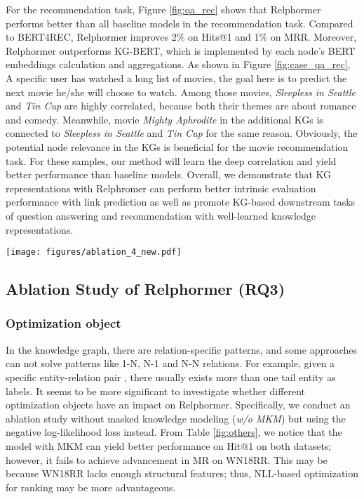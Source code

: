 \documentclass[sigconf]{acmart}
\begin{document}
For the recommendation task, Figure  \ref{fig:qa_rec}  shows that Relphormer performs better than all baseline models in the recommendation task.
Compared to BERT4REC, Relphormer improves 2\% on Hits@1 and 1\% on MRR.
Moreover, Relphormer outperforms KG-BERT, which is implemented by each node's BERT embeddings calculation and aggregations.
As shown in Figure \ref{fig:case_qa_rec}, 
A specific user has watched a long list of movies, the goal here is to predict the next movie he/she will choose to watch.
Among those movies, \textit{Sleepless in Seattle} and \textit{Tin Cup} are highly correlated, because both their themes are about romance and comedy.
Meanwhile,  movie \textit{Mighty Aphrodite} in the additional KGs is connected to \textit{Sleepless in Seattle} and \textit{Tin Cup} for the same reason.
Obviously, the potential node relevance in the KGs is beneficial for the movie recommendation task. 
For these samples, our method will learn the deep correlation and yield better performance than baseline models.
Overall, we demonstrate that KG representations with Relphromer can perform better intrinsic evaluation performance with link prediction as well as promote KG-based downstream tasks of question answering and recommendation with well-learned knowledge representations.



\begin{figure*}
    \centering

    \texttt{[image: figures/ablation\_4\_new.pdf]}

    \caption{
    Ablation study on WN18RR and FB15K-237.
    Left: results of different model variants on Hits@1.
    Right: results of different model variants on Mean Rank.
    }
    
\label{fig:others}
\end{figure*}


\subsection{Ablation Study of Relphormer (RQ3)}

\subsubsection{\textbf{Optimization object}}
In the knowledge graph, there are relation-specific patterns, and some approaches can not solve patterns like 1-N, N-1 and N-N relations.
For example, given a specific entity-relation pair , there usually exists more than one tail entity as labels.
It seems to be more significant to investigate whether different optimization objects have an impact on Relphormer.
Specifically, we conduct an ablation study without masked knowledge modeling (\textit{w/o MKM}) but using the negative log-likelihood loss instead.
From Table \ref{fig:others}, we notice that the model with MKM can yield better performance on Hit@1 on both datasets; however, it fails to achieve advancement in MR on WN18RR. 
This may be because WN18RR lacks enough structural features; thus, NLL-based optimization for ranking may be more advantageous.
\end{document}
